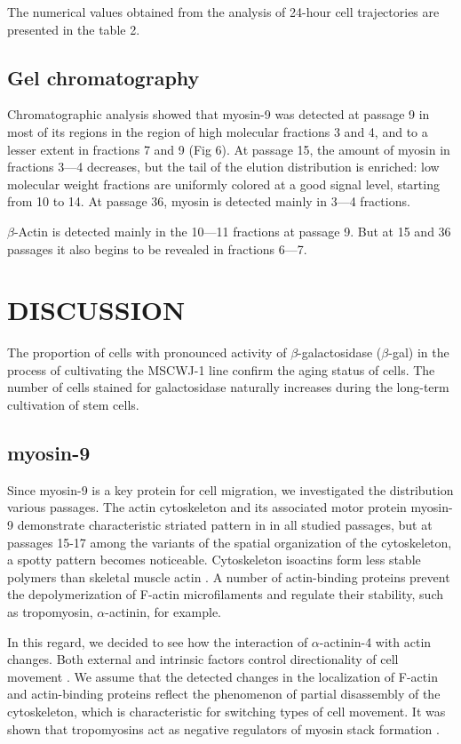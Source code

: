 \documentclass[alpha-refs]{wiley-article}
\begin{document}
The numerical values obtained from the analysis of 24-hour cell trajectories are presented in the table 2.

\subsection{Gel chromatography}


Chromatographic analysis showed that myosin-9 was detected at passage 9 in most of its regions in the region of high molecular fractions 3 and 4, and to a lesser extent in fractions 7 and 9 (Fig 6).
At passage 15, the amount of myosin in fractions 3–--4 decreases, but the tail of the elution distribution is enriched: low molecular weight fractions are uniformly colored at a good signal level, starting from 10 to 14.
At passage 36, myosin is detected mainly in 3---4 fractions.


$\beta$-Actin is detected mainly in the 10---11 fractions at passage 9.
But at 15 and 36 passages it also begins to be revealed in fractions 6---7.

\section{DISCUSSION}

The proportion of cells with pronounced activity of $\beta$-galactosidase ($\beta$-gal) in the process of cultivating the MSCWJ-1 line confirm the aging status of cells.
The number of cells stained for galactosidase naturally increases during the long-term cultivation of stem cells.

\subsection*{myosin-9}

Since myosin-9 is a key protein for cell migration, we investigated the distribution various passages.
The actin cytoskeleton and its associated motor protein myosin-9 demonstrate characteristic striated pattern in in all studied passages, but at passages 15-17 among the variants of the spatial organization of the cytoskeleton, a spotty pattern becomes noticeable.
Cytoskeleton isoactins form less stable polymers than skeletal muscle actin \cite{khaitlina2001functional}.
A number of actin-binding proteins prevent the depolymerization of F-actin microfilaments and regulate their stability, such as tropomyosin, $\alpha$-actinin, for example.

In this regard, we decided to see how the interaction of $\alpha$-actinin-4 with actin changes.
Both external and intrinsic factors control directionality of cell movement \cite{tiurin2013molecular}.
We assume that the detected changes in the localization of F-actin and actin-binding proteins reflect the phenomenon of partial disassembly of the cytoskeleton, which is characteristic for switching types of cell movement.
It was shown that tropomyosins act as negative regulators of myosin stack formation \cite{hu2019reciprocal}.
\end{document}
